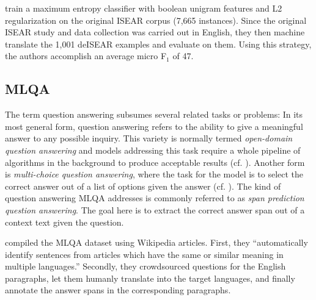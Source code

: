 \cite{troiano2019crowdsourcing} train a maximum entropy classifier with boolean unigram features
and L2 regularization on the original ISEAR corpus (7,665 instances). Since the original ISEAR
study and data collection was carried out in English, they then machine translate the 1,001
deISEAR examples and evaluate on them. Using this strategy, the authors accomplish an average
micro F$_1$ of 47.

\subsection{MLQA}
\label{sec:mlqa}

The term question answering subsumes several related tasks or problems: In its most general form,
question answering refers to the ability to give a meaningful answer to any possible inquiry.
This variety is normally termed \emph{open-domain question answering} and models addressing this
task require a whole pipeline of algorithms in the background to produce acceptable results (cf.
\cite{chen-yih-2020-open}). Another form is \emph{multi-choice question answering}, where the
task for the model is to select the correct answer out of a list of options given the answer (cf.
\cite{welbl2017crowdsourcing}). The kind of question answering MLQA addresses is commonly referred
to as \emph{span prediction question answering}. The goal here is to extract the correct answer
span out of a context text given the question.

\cite{lewis2019mlqa} compiled the MLQA dataset using Wikipedia articles. First, they
``automatically identify sentences from \textelp{} articles which have the same or
similar meaning in multiple languages.'' Secondly, they crowdsourced questions
for the English paragraphs, let them humanly translate into the target languages,
and finally annotate the answer spans in the corresponding paragraphs.

